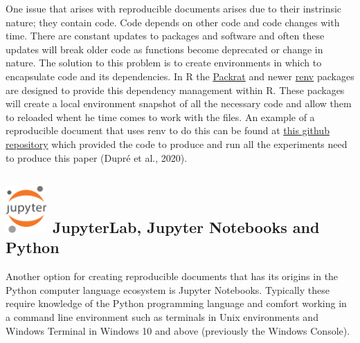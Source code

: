\documentclass[
  letterpaper,
  DIV=11,
  numbers=noendperiod]{scrreprt}
\begin{document}
One issue that arises with reproducible documents arises due to their
instrinsic nature; they contain code. Code depends on other code and
code changes with time. There are constant updates to packages and
software and often these updates will break older code as functions
become deprecated or change in nature. The solution to this problem is
to create environments in which to encapsulate code and its
dependencies. In R the
\href{https://rstudio.github.io/packrat/}{Packrat} and newer
\href{https://rstudio.github.io/renv/articles/renv.html}{renv} packages
are designed to provide this dependency management within R. These
packages will create a local environment snapshot of all the necessary
code and allow them to reloaded whent he time comes to work with the
files. An example of a reproducible document that uses renv to do this
can be found at
\href{https://github.com/damien-dupre/machine_challenge}{this github
repository} which provided the code to produce and run all the
experiments need to produce this paper (Dupré et al., 2020).

\subsection[ JupyterLab, Jupyter Notebooks and
Python]{\texorpdfstring{\protect\includegraphics[width=0.625in,height=\textheight]{images/squarelogo-greytext-orangebody-greymoons.png}
JupyterLab, Jupyter Notebooks and
Python}{ JupyterLab, Jupyter Notebooks and Python}}\label{jupyterlab-jupyter-notebooks-and-python}

Another option for creating reproducible documents that has its origins
in the Python computer language ecosystem is Jupyter Notebooks.
Typically these require knowledge of the Python programming language and
comfort working in a command line environment such as terminals in Unix
environments and Windows Terminal in Windows 10 and above (previously
the Windows Console).
\end{document}
